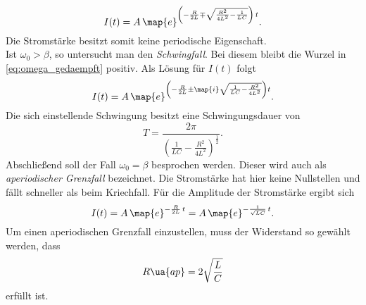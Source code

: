 \begin{equation*}
     I(t)=A\,\map{e}^{\left(-\frac{R}{2L}\mp\sqrt{\frac{R^2}{4L^2}-\frac{1}{LC}}\right)\,t}.
\end{equation*}
Die Stromstärke besitzt somit keine periodische Eigenschaft.
\\
Ist $\omega_0>\beta$, so untersucht man den \emph{Schwingfall}. %
Bei diesem bleibt die Wurzel in \eqref{eq:omega_gedaempft} positiv. Als
Lösung für $I(t)$ folgt
\begin{equation*}
  I(t)=A\,\map{e}^{\left(-\frac{R}{2L}\pm\map{i}\sqrt{{\frac{1}{LC}}-\frac{R^2}{4L^2}}\right)t}.
\end{equation*}
Die sich einstellende Schwingung besitzt eine Schwingungsdauer von
\begin{equation}
  \label{eq:schwingungsdauer_schwingfall}
  T=\frac{2\pi}{\left(\frac{1}{LC}-\frac{R^2}{4L^2}\right)^{\frac{1}{2}}}.
\end{equation}
Abschließend soll der Fall $\omega_0=\beta$ besprochen werden.
Dieser wird auch als \emph{aperiodischer Grenzfall} bezeichnet.
Die Stromstärke hat hier keine Nullstellen und fällt schneller als
beim Kriechfall.
Für die Amplitude der Stromstärke ergibt sich
\begin{equation}
  \label{eq:ap_grenz}
  I(t)=A\,\map{e}^{-\frac{R}{2L}\,t}=A\,\map{e}^{-\frac{1}{\sqrt{LC}}\,t}.
\end{equation}
Um einen aperiodischen Grenzfall einzustellen, muss der Widerstand so gewählt werden,
dass
\begin{equation}
  \label{eq:widerstand_aperiodischer_grenzfall}
  R\ua{ap}=2\sqrt{\frac{L}{C}}
\end{equation}
erfüllt ist.
